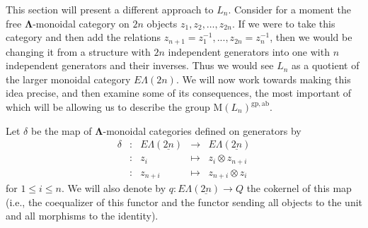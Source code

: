 \documentclass{amsbook} %
\newcommand{\mb}{\mathbf}
\newcommand{\ML}{\mathbf{\Lambda}}
\newcommand{\EL}{E\Lambda}
\newcommand{\ELn}{E\Lambda(\underline{n})}
\newcommand{\ELnn}{E\Lambda(\underline{2n})}
\numberwithin{section}{chapter}
\begin{document}
This section will present a different approach to $L_n$. Consider for a moment the free $\ML$-monoidal category on $2n$ objects $z_1, z_2, \ldots, z_{2n}$. If we were to take this category and then add the relations $z_{n+1} = z_1^{-1}, ..., z_{2n} = z_n^{-1}$, then we would be changing it from a structure with $2n$ independent generators into one with $n$ independent generators and their inverses. Thus we would see $L_n$ as a quotient of the larger monoidal category $\EL(2n)$. We will now work towards making this idea precise, and then examine some of its consequences, the most important of which will be allowing us to describe the group $\mathrm{M}(L_n)^{\mathrm{gp},\mathrm{ab}}$.


%


\begin{Defi}\label{qdef} Let $\delta$ be the map of $\ML$-monoidal categories defined on generators by
\[ \begin{array}{rlrlll}
			\delta & : & \EL(\underline{2n}) & \to & \EL(\underline{2n}) \\
			& : & z_{i} & \mapsto & z_i \otimes z_{n+i} \\
			& : & z_{n+i} & \mapsto & z_{n+i} \otimes z_i			
		\end{array}
\]
for $1 \le i \le n$. We will also denote by $q: \EL(\underline{2n}) \to Q$ the cokernel of this map (i.e., the coequalizer of this functor and the functor sending all objects to the unit and all morphisms to the identity).  
\end{Defi}


\end{document}
